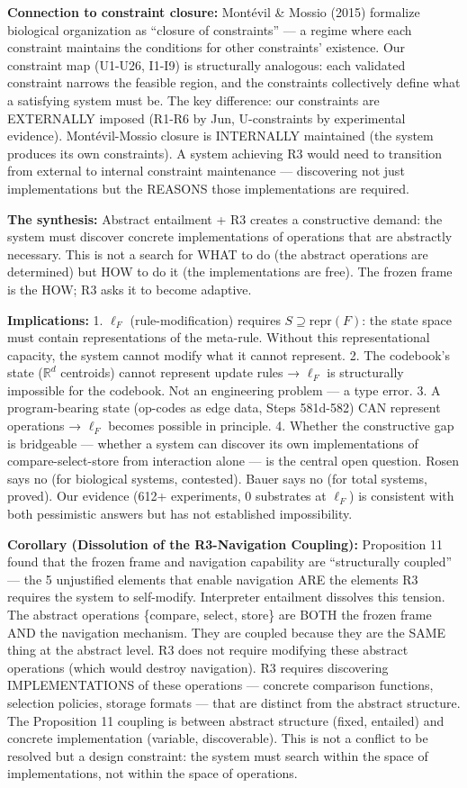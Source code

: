 \documentclass[
  11pt,
]{article}
\begin{document}
\textbf{Connection to constraint closure:} Montévil \& Mossio (2015)
formalize biological organization as ``closure of constraints'' --- a
regime where each constraint maintains the conditions for other
constraints' existence. Our constraint map (U1-U26, I1-I9) is
structurally analogous: each validated constraint narrows the feasible
region, and the constraints collectively define what a satisfying system
must be. The key difference: our constraints are EXTERNALLY imposed
(R1-R6 by Jun, U-constraints by experimental evidence). Montévil-Mossio
closure is INTERNALLY maintained (the system produces its own
constraints). A system achieving R3 would need to transition from
external to internal constraint maintenance --- discovering not just
implementations but the REASONS those implementations are required.

\textbf{The synthesis:} Abstract entailment + R3 creates a constructive
demand: the system must discover concrete implementations of operations
that are abstractly necessary. This is not a search for WHAT to do (the
abstract operations are determined) but HOW to do it (the
implementations are free). The frozen frame is the HOW; R3 asks it to
become adaptive.

\textbf{Implications:} 1. \(\ell_F\) (rule-modification) requires
\(S \supseteq \text{repr}(F)\): the state space must contain
representations of the meta-rule. Without this representational
capacity, the system cannot modify what it cannot represent. 2. The
codebook's state (\(\mathbb{R}^d\) centroids) cannot represent update
rules → \(\ell_F\) is structurally impossible for the codebook. Not an
engineering problem --- a type error. 3. A program-bearing state
(op-codes as edge data, Steps 581d-582) CAN represent operations →
\(\ell_F\) becomes possible in principle. 4. Whether the constructive
gap is bridgeable --- whether a system can discover its own
implementations of compare-select-store from interaction alone --- is
the central open question. Rosen says no (for biological systems,
contested). Bauer says no (for total systems, proved). Our evidence
(612+ experiments, 0 substrates at \(\ell_F\)) is consistent with both
pessimistic answers but has not established impossibility.

\textbf{Corollary (Dissolution of the R3-Navigation Coupling):}
Proposition 11 found that the frozen frame and navigation capability are
``structurally coupled'' --- the 5 unjustified elements that enable
navigation ARE the elements R3 requires the system to self-modify.
Interpreter entailment dissolves this tension. The abstract operations
\{compare, select, store\} are BOTH the frozen frame AND the navigation
mechanism. They are coupled because they are the SAME thing at the
abstract level. R3 does not require modifying these abstract operations
(which would destroy navigation). R3 requires discovering
IMPLEMENTATIONS of these operations --- concrete comparison functions,
selection policies, storage formats --- that are distinct from the
abstract structure. The Proposition 11 coupling is between abstract
structure (fixed, entailed) and concrete implementation (variable,
discoverable). This is not a conflict to be resolved but a design
constraint: the system must search within the space of implementations,
not within the space of operations.
\end{document}
